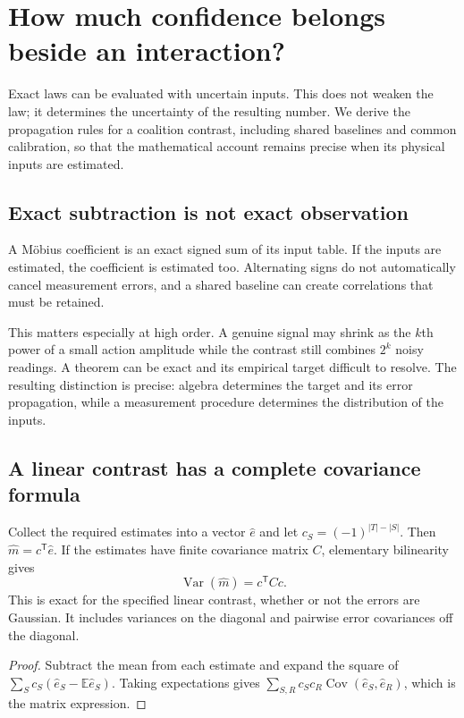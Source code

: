 \chapter{How much confidence belongs beside an interaction?}\label{ch:uncertainty}

Exact laws can be evaluated with uncertain inputs. This does not weaken the law; it determines the uncertainty of the resulting number. We derive the propagation rules for a coalition contrast, including shared baselines and common calibration, so that the mathematical account remains precise when its physical inputs are estimated.


\section{Exact subtraction is not exact observation}
A Möbius coefficient is an exact signed sum of its input table. If the inputs are estimated, the coefficient is estimated too. Alternating signs do not automatically cancel measurement errors, and a shared baseline can create correlations that must be retained.

This matters especially at high order. A genuine signal may shrink as the $k$th power of a small action amplitude while the contrast still combines $2^k$ noisy readings. A theorem can be exact and its empirical target difficult to resolve. The resulting distinction is precise: algebra determines the target and its error propagation, while a measurement procedure determines the distribution of the inputs.

\section{A linear contrast has a complete covariance formula}
Collect the required estimates into a vector $\widehat e$ and let $c_S=(-1)^{|T|-|S|}$. Then $\widehat m=c^{\mathsf T}\widehat e$. If the estimates have finite covariance matrix $C$, elementary bilinearity gives
\begin{equation}\label{eq:variance}
 \operatorname{Var}(\widehat m)=c^{\mathsf T}Cc.
\end{equation}
This is exact for the specified linear contrast, whether or not the errors are Gaussian. It includes variances on the diagonal and pairwise error covariances off the diagonal.

\begin{proof}
Subtract the mean from each estimate and expand the square of $\sum_S c_S(\widehat e_S-\mathbb E\widehat e_S)$. Taking expectations gives $\sum_{S,R}c_Sc_R\operatorname{Cov}(\widehat e_S,\widehat e_R)$, which is the matrix expression.
\end{proof}

